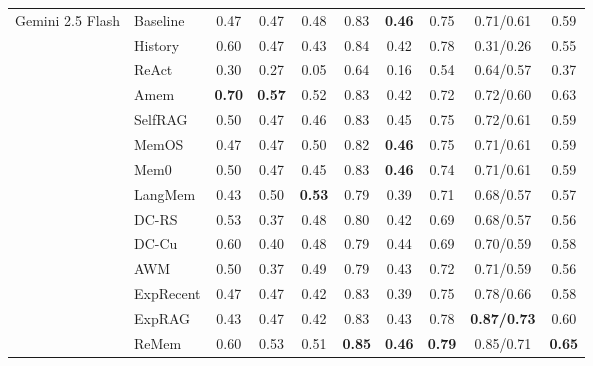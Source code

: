 \begin{table}[t!]
{\begin{tabular}{l l*{8}{c}}
\multirow{15}{*}{Gemini 2.5 Flash}
 & Baseline           & 0.47 & 0.47 & 0.48 & 0.83 & \textbf{0.46} & 0.75 & 0.71/0.61 & 0.59 \\
 & History       & 0.60 & 0.47 & 0.43 & 0.84 & 0.42 & 0.78 & 0.31/0.26 & 0.55 \\
\cmidrule(lr){2-10}
 & ReAct                    & 0.30 & 0.27 & 0.05 & 0.64 & 0.16 & 0.54 & 0.64/0.57 & 0.37 \\
 & Amem                     & \textbf{0.70} & \textbf{0.57} & 0.52 & 0.83 & 0.42 & 0.72 & 0.72/0.60 & 0.63 \\
\cmidrule(lr){2-10}
 & SelfRAG                  & 0.50 & 0.47 & 0.46 & 0.83 & 0.45 & 0.75 & 0.72/0.61 & 0.59 \\
 & MemOS                    & 0.47 & 0.47 & 0.50 & 0.82 & \textbf{0.46} & 0.75 & 0.71/0.61 & 0.59 \\
 & Mem0                     & 0.50 & 0.47 & 0.45 & 0.83 & \textbf{0.46} & 0.74 & 0.71/0.61 & 0.59 \\
 & LangMem                  & 0.43 & 0.50 & \textbf{0.53} & 0.79 & 0.39 & 0.71 & 0.68/0.57 & 0.57 \\
\cmidrule(lr){2-10}
 & DC-RS                    & 0.53 & 0.37 & 0.48 & 0.80 & 0.42 & 0.69 & 0.68/0.57 & 0.56 \\
 & DC-Cu                    & 0.60 & 0.40 & 0.48 & 0.79 & 0.44 & 0.69 & 0.70/0.59 & 0.58 \\
 & AWM                      & 0.50 & 0.37 & 0.49 & 0.79 & 0.43 & 0.72 & 0.71/0.59 & 0.56 \\
\cmidrule(lr){2-10}
 & ExpRecent                & 0.47 & 0.47 & 0.42 & 0.83 & 0.39 & 0.75 & 0.78/0.66 & 0.58 \\
 & ExpRAG                   & 0.43 & 0.47 & 0.42 & 0.83 & 0.43 & 0.78 & \textbf{0.87/0.73} & 0.60 \\
 & ReMem                    & 0.60 & 0.53 & 0.51 & \textbf{0.85} & \textbf{0.46} & \textbf{0.79} & 0.85/0.71 & \textbf{0.65} \\
\midrule



\end{tabular}}
\end{table}
